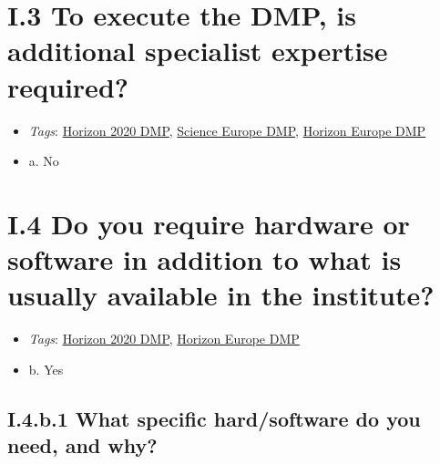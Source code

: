 \documentclass[a4paper,12pt]{report}
\begin{document}
\section*{\protect\textcolor{colorSecId}{I.3} To execute the DMP, is additional specialist expertise required?}

\label{1e85da40-bbfc-4180-903e-6c569ed2da38.83c0d09d-e74c-4c81-a52c-aaa2e18415ac}


\begin{itemize}
  \item \textit{Tags}: \ul{Horizon 2020 DMP}, \ul{Science Europe DMP}, \ul{Horizon Europe DMP}
  \end{itemize}




\begin{itemize}
  \item[\CheckmarkBold] a. No
\end{itemize}






\section*{\protect\textcolor{colorSecId}{I.4} Do you require hardware or software in addition to what is usually available in the institute?}

\label{1e85da40-bbfc-4180-903e-6c569ed2da38.09c7c989-6461-417f-b09e-228491c051c6}


\begin{itemize}
  \item \textit{Tags}: \ul{Horizon 2020 DMP}, \ul{Horizon Europe DMP}
  \end{itemize}




\begin{itemize}
  \item[\CheckmarkBold] b. Yes
\end{itemize}




\subsection*{\protect\textcolor{colorSecId}{I.4.b.1} What specific hard/software do you need, and why?}
\end{document}
